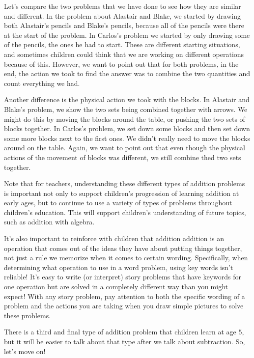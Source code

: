 \documentclass{ximera}
\begin{document}
Let's compare the two problems that we have done to see how they are similar and different. In the problem about Alastair and Blake, we started by drawing both Alastair's pencils and Blake's pencils, because all of the pencils were there at the start of the problem. In Carlos's problem we started by only drawing some of the pencils, the ones he had to start. These are different starting situations, and sometimes children could think that we are working on different operations because of this. However, we want to point out that for both problems, in the end, the action we took to find the answer was to combine the two quantities and count everything we had. 

Another difference is the physical action we took with the blocks. In Alastair and Blake's problem, we show the two sets being combined together with arrows. We might do this by moving the blocks around the table, or pushing the two sets of blocks together. In Carlos's problem, we set down some blocks and then set down some more blocks next to the first ones. We didn't really need to move the blocks around on the table. Again, we want to point out that even though the physical actions of the movement of blocks was different, we still combine thed two sets together.

Note that for teachers, understanding these different types of addition problems is important not only to support children's progression of learning addition at early ages, but to continue to use a variety of types of problems throughout children's education. This will support children's understanding of future topics, such as addition with algebra.

It's also important to reinforce with children that addition addition is an operation that comes out of the ideas they have about putting things together, not just a rule we memorize when it comes to certain wording. Specifically, when determining what operation to use in a word problem, using key words isn't reliable! It's easy to write (or interpret) story problems that have keywords for one operation but are solved in a completely different way than you might expect! With any story problem, pay attention to both the specific wording of a problem and the actions you are taking when you draw simple pictures to solve these problems.

There is a third and final type of addition problem that children learn at age $5$, but it will be easier to talk about that type after we talk about subtraction. So, let's move on!
\end{document}
